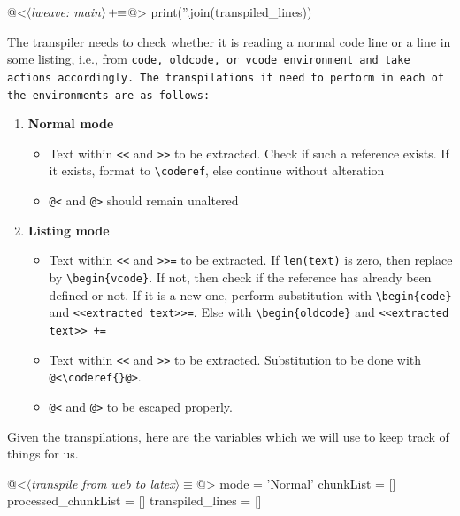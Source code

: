 \begin{oldcode}
@<$\langle$\textit{lweave: main}$\rangle \thinspace +\!\!\equiv$@>
print(''.join(transpiled_lines))

\end{oldcode}

The transpiler needs to check whether it is reading a normal code line or a line in some listing, i.e., from
\tt code\rm, \tt oldcode\rm, or \tt vcode \rm environment and take actions accordingly. The transpilations it
need to perform in each of the environments are as follows:

\begin{enumerate}
    \item \textbf{Normal mode}
    \begin{itemize}
        \item[] Text within \verb|<<| and \verb|>>| to be extracted. Check if such a reference exists. If it
        exists, format to \verb|\coderef|, else continue without alteration
        \item[] \verb|@<| and \verb|@>| should remain unaltered 
    \end{itemize}
    \item \textbf{Listing mode}
    \begin{itemize}
        \item[] Text within \verb|<<| and \verb|>>=| to be extracted. If \verb|len(text)| is zero, then
        replace by \verb|\begin{vcode}|. If not, then check if the reference has already been defined or not.
        If it is a new one, perform substitution with \verb|\begin{code}| and \verb|<<extracted text>>=|. Else
        with \verb|\begin{oldcode}| and \verb|<<extracted text>> +=|
        \item[] Text within \verb|<<| and \verb|>>| to be extracted. Substitution to be done with
        \verb|@<\coderef{}@>|.
        \item[] \verb|@<| and \verb|@>| to be escaped properly.
    \end{itemize}
\end{enumerate}

Given the transpilations, here are the variables which we will use to keep track of things for us.

\begin{code}
@<$\langle$\textit{transpile from web to latex}$\rangle\equiv$@>
mode = 'Normal'
chunkList = []
processed_chunkList = []
transpiled_lines = []

\end{code}


